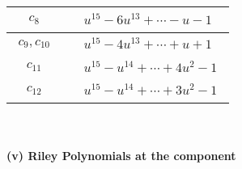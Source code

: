 \documentclass[1p]{elsarticle_modified}
\theoremstyle{definition}
\begin{document}
\begin{tabular}{m{50pt}|m{274pt}}
\hline $$\begin{aligned}c_{8}\end{aligned}$$&$\begin{aligned}
&u^{15}-6 u^{13}+\cdots- u-1
\end{aligned}$\\
\hline $$\begin{aligned}c_{9},c_{10}\end{aligned}$$&$\begin{aligned}
&u^{15}-4 u^{13}+\cdots+u+1
\end{aligned}$\\
\hline $$\begin{aligned}c_{11}\end{aligned}$$&$\begin{aligned}
&u^{15}- u^{14}+\cdots+4 u^2-1
\end{aligned}$\\
\hline $$\begin{aligned}c_{12}\end{aligned}$$&$\begin{aligned}
&u^{15}- u^{14}+\cdots+3 u^2-1
\end{aligned}$\\
\hline
\end{tabular}\\~\\
\newpage\renewcommand{\arraystretch}{1}
\flushleft \textbf{(v) Riley Polynomials at the component}\newline \\
\end{document}
